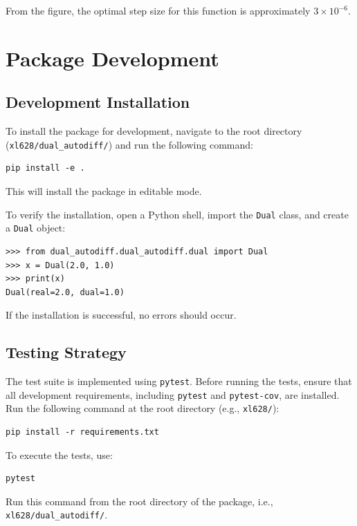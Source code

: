 \documentclass{article}
\begin{document}
From the figure, the optimal step size for this function is approximately $3 \times 10^{-6}$.

\section{Package Development}

\subsection{Development Installation}

To install the package for development, navigate to the root directory (\texttt{xl628/dual\_autodiff/}) and run the following command:

\begin{lstlisting}[style=input]
pip install -e . 
\end{lstlisting}

This will install the package in editable mode.

To verify the installation, open a Python shell, import the \texttt{Dual} class, and create a \texttt{Dual} object:

\begin{lstlisting}[style=pythonstyle]
>>> from dual_autodiff.dual_autodiff.dual import Dual
>>> x = Dual(2.0, 1.0)
>>> print(x)
Dual(real=2.0, dual=1.0)
\end{lstlisting}

If the installation is successful, no errors should occur.

\subsection{Testing Strategy}

The test suite is implemented using \texttt{pytest}. Before running the tests, ensure that all development requirements, including \texttt{pytest} and \texttt{pytest-cov}, are installed. Run the following command at the root directory (e.g., \texttt{xl628/}):

\begin{lstlisting}[style=input]
pip install -r requirements.txt
\end{lstlisting}

To execute the tests, use:

\begin{lstlisting}[style=input]
pytest 
\end{lstlisting}

Run this command from the root directory of the package, i.e., \texttt{xl628/dual\_autodiff/}.
\end{document}
